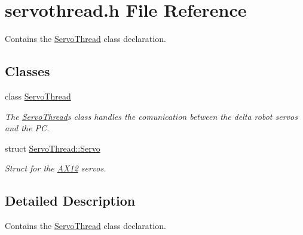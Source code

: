 \hypertarget{a00020}{}\section{servothread.\+h File Reference}
\label{a00020}


Contains the \hyperlink{a00007}{Servo\+Thread} class declaration.  


\subsection*{Classes}
\begin{DoxyCompactItemize}
\item 
class \hyperlink{a00007}{Servo\+Thread}
\begin{DoxyCompactList}\small\item\em The \hyperlink{a00007}{Servo\+Thread}\textquotesingle{}s class handles the comunication between the delta robot servos and the P\+C. \end{DoxyCompactList}\item 
struct \hyperlink{a00006}{Servo\+Thread\+::\+Servo}
\begin{DoxyCompactList}\small\item\em Struct for the \hyperlink{a00001}{A\+X12} servos. \end{DoxyCompactList}\end{DoxyCompactItemize}


\subsection{Detailed Description}
Contains the \hyperlink{a00007}{Servo\+Thread} class declaration. 

